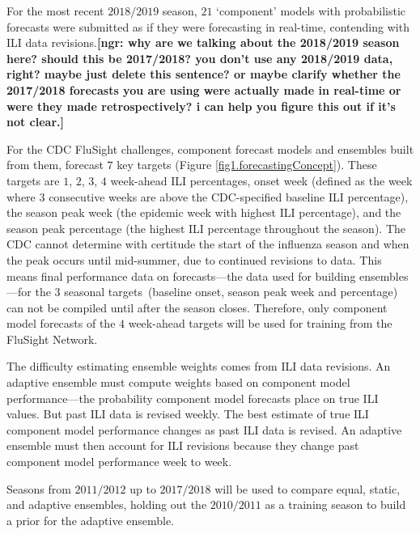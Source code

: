 \documentclass[12pt]{article}
\def\ngr#1{{\small\color{Red}\textbf{[ngr: #1]}}}
\begin{document}
For the most recent $2018/2019$ season, $21$ `component' models with probabilistic forecasts were submitted as if they were forecasting in real-time, contending with ILI data revisions.\ngr{why are we talking about the 2018/2019 season here? should this be 2017/2018? you don't use any 2018/2019 data, right? maybe just delete this sentence? or maybe clarify whether the 2017/2018 forecasts you are using were actually made in real-time or were they made retrospectively? i can help you figure this out if it's not clear.}

For the CDC FluSight challenges, component forecast models and ensembles built from them, forecast $7$ key targets (Figure \ref{fig1.forecastingConcept}). These targets are $1$, $2$, $3$, $4$ week-ahead ILI percentages, onset week (defined as the week where $3$ consecutive weeks are above the CDC-specified baseline ILI percentage), the season peak week (the epidemic week with highest ILI percentage), and the season peak percentage (the highest ILI percentage throughout the season).
The CDC cannot determine with certitude the start of the influenza season and when the peak occurs until mid-summer, due to continued revisions to data.
This means final performance data on forecasts---the data used for building ensembles---for the $3$ seasonal targets~(baseline onset, season peak week and percentage) can not be compiled until after the season closes.
Therefore, only component model forecasts of the $4$ week-ahead targets will be used for training from the FluSight Network.

The difficulty estimating ensemble weights comes from ILI data revisions.
An adaptive ensemble must compute weights based on component model performance---the probability component model forecasts place on true ILI values.
But past ILI data is revised weekly.
The best estimate of true ILI component model performance changes as past ILI data is revised. 
An adaptive ensemble must then account for ILI revisions because they change past component model performance week to week.

Seasons from $2011/2012$ up to $2017/2018$ will be used to compare equal, static, and adaptive ensembles, holding out the $2010/2011$ as a training season to build a prior for the adaptive ensemble.
\end{document}
